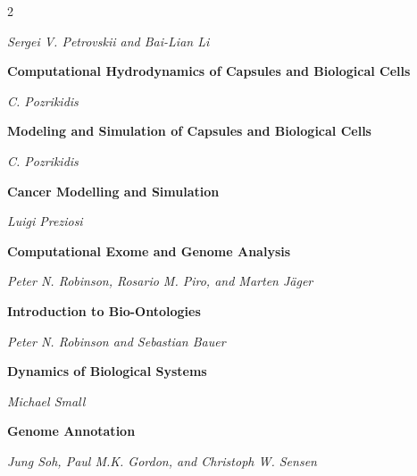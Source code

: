 \begin{multicols}{2}
\begin{minipage}{\linewidth}
\textit{Sergei V. Petrovskii and Bai-Lian Li}
\end{minipage}\par\medskip
\par\noindent\begin{minipage}{\linewidth}
\raggedright
\textbf{Computational Hydrodynamics of Capsules and Biological Cells}\par
\textit{C. Pozrikidis}
\end{minipage}\par\medskip
\par\noindent\begin{minipage}{\linewidth}
\raggedright
\textbf{Modeling and Simulation of Capsules and Biological Cells}\par
\textit{C. Pozrikidis}
\end{minipage}\par\medskip
\par\noindent\begin{minipage}{\linewidth}
\raggedright
\textbf{Cancer Modelling and Simulation}\par
\textit{Luigi Preziosi}
\end{minipage}\par\medskip
\par\noindent\begin{minipage}{\linewidth}
\raggedright
\textbf{Computational Exome and Genome Analysis}\par
\textit{Peter N. Robinson, Rosario M. Piro, and Marten Jäger}
\end{minipage}\par\medskip
\par\noindent\begin{minipage}{\linewidth}
\raggedright
\textbf{Introduction to Bio-Ontologies}\par
\textit{Peter N. Robinson and Sebastian Bauer}
\end{minipage}\par\medskip
\par\noindent\begin{minipage}{\linewidth}
\raggedright
\textbf{Dynamics of Biological Systems}\par
\textit{Michael Small}
\end{minipage}\par\medskip
\par\noindent\begin{minipage}{\linewidth}
\raggedright
\textbf{Genome Annotation}\par
\textit{Jung Soh, Paul M.K. Gordon, and Christoph W. Sensen}

\end{minipage}
\end{multicols}
